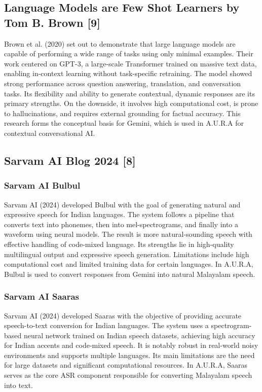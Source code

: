 \subsection{Language Models are Few Shot Learners  by Tom B. Brown [9]}

Brown et al. (2020) set out to demonstrate that large language models are capable of performing a wide range of tasks using only minimal examples. Their work centered on GPT-3, a large-scale Transformer trained on massive text data, enabling in-context learning without task-specific retraining. The model showed strong performance across question answering, translation, and conversation tasks. Its flexibility and ability to generate contextual, dynamic responses are its primary strengths. On the downside, it involves high computational cost, is prone to hallucinations, and requires external grounding for factual accuracy. This research forms the conceptual basis for Gemini, which is used in A.U.R.A for contextual conversational AI.

\subsection{Sarvam AI Blog 2024 [8]}

  \subsubsection{Sarvam AI Bulbul  }
Sarvam AI (2024) developed Bulbul with the goal of generating natural and expressive speech for Indian languages. The system follows a pipeline that converts text into phonemes, then into mel-spectrograms, and finally into a waveform using neural models. The result is more natural-sounding speech with effective handling of code-mixed language. Its strengths lie in high-quality multilingual output and expressive speech generation. Limitations include high computational cost and limited training data for certain languages. In A.U.R.A, Bulbul is used to convert responses from Gemini into natural Malayalam speech.

  \subsubsection{Sarvam AI Saaras}
Sarvam AI (2024) developed Saaras with the objective of providing accurate speech-to-text conversion for Indian languages. The system uses a spectrogram-based neural network trained on Indian speech datasets, achieving high accuracy for Indian accents and code-mixed speech. It is notably robust in real-world noisy environments and supports multiple languages. Its main limitations are the need for large datasets and significant computational resources. In A.U.R.A, Saaras serves as the core ASR component responsible for converting Malayalam speech into text.

